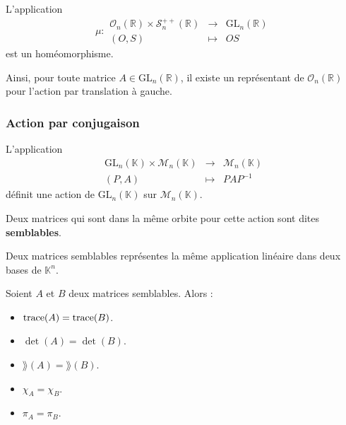   \begin{theorem}
    L'application
    \[ \mu :
    \begin{array}{ccc}
      \mathcal{O}_n(\mathbb{R}) \times \mathcal{S}_n^{++}(\mathbb{R}) &\rightarrow& \mathrm{GL}_n(\mathbb{R}) \\
      (O, S) &\mapsto& OS
    \end{array}
    \]
    est un homéomorphisme.
  \end{theorem}

  \begin{remark}
    Ainsi, pour toute matrice $A \in \mathrm{GL}_n(\mathbb{R})$, il existe un représentant de $\mathcal{O}_n(\mathbb{R})$ pour l'action par translation à gauche.
  \end{remark}

  \subsubsection{Action par conjugaison}


  \begin{proposition}
    L'application
    \[
      \begin{array}{ccc}
        \mathrm{GL}_n(\mathbb{K}) \times \mathcal{M}_n(\mathbb{K}) &\rightarrow& \mathcal{M}_n(\mathbb{K}) \\
        (P, A) &\mapsto& PAP^{-1}
      \end{array}
    \]
    définit une action de $\mathrm{GL}_n(\mathbb{K})$ sur $\mathcal{M}_n(\mathbb{K})$.
  \end{proposition}

  \begin{definition}
    Deux matrices qui sont dans la même orbite pour cette action sont dites \textbf{semblables}.
  \end{definition}


  \begin{remark}
    Deux matrices semblables représentes la même application linéaire dans deux bases de $\mathbb{K}^n$.
  \end{remark}


  \begin{theorem}
    Soient $A$ et $B$ deux matrices semblables. Alors :
    \begin{itemize}
      \item $\operatorname{trace}(A) = \operatorname{trace}(B)$.
      \item $\det(A) = \det(B)$.
      \item $\rang(A) = \rang(B)$.
      \item $\chi_A = \chi_B$.
      \item $\pi_A = \pi_B$.
    \end{itemize}
  \end{theorem}

